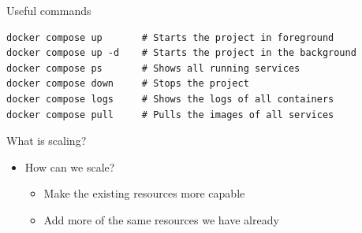 \begin{frame}[fragile]{Useful commands}
  \begin{termbox}
\begin{lstlisting}[style=wstermstyle, basicstyle=\ttfamily\scriptsize\color{wsgreen}]
docker compose up       # Starts the project in foreground
docker compose up -d    # Starts the project in the background
docker compose ps       # Shows all running services
docker compose down     # Stops the project
docker compose logs     # Shows the logs of all containers
docker compose pull     # Pulls the images of all services
\end{lstlisting}
  \end{termbox}
\end{frame}

\breakframe


\begin{frame}{What is scaling?}
  \begin{itemize}
    \item How can we scale?
      \begin{itemize}
        \item Make the existing resources more capable
        \item Add more of the same resources we have already
      \end{itemize}
  \end{itemize}
\end{frame}

